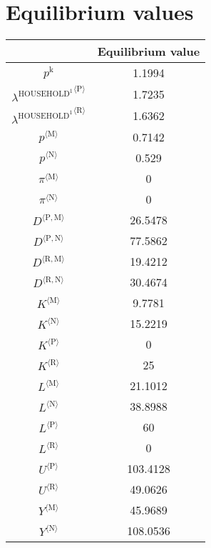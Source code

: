 

\section{Equilibrium values}


\begin{tabular}{c|c|}
  & Equilibrium value\\
\hline
$p^{\mathrm{k}}$ & 1.1994 \\
${\lambda^{\mathrm{HOUSEHOLD}^{\mathrm{1}}}}^{\langle \mathrm{P}\rangle}$ & 1.7235 \\
${\lambda^{\mathrm{HOUSEHOLD}^{\mathrm{1}}}}^{\langle \mathrm{R}\rangle}$ & 1.6362 \\
${p}^{\langle \mathrm{M}\rangle}$ & 0.7142 \\
${p}^{\langle \mathrm{N}\rangle}$ & 0.529 \\
${\pi}^{\langle \mathrm{M}\rangle}$ & 0 \\
${\pi}^{\langle \mathrm{N}\rangle}$ & 0 \\
${D}^{\langle \mathrm{P},\mathrm{M}\rangle}$ & 26.5478 \\
${D}^{\langle \mathrm{P},\mathrm{N}\rangle}$ & 77.5862 \\
${D}^{\langle \mathrm{R},\mathrm{M}\rangle}$ & 19.4212 \\
${D}^{\langle \mathrm{R},\mathrm{N}\rangle}$ & 30.4674 \\
${K}^{\langle \mathrm{M}\rangle}$ & 9.7781 \\
${K}^{\langle \mathrm{N}\rangle}$ & 15.2219 \\
${K}^{\langle \mathrm{P}\rangle}$ & 0 \\
${K}^{\langle \mathrm{R}\rangle}$ & 25 \\
${L}^{\langle \mathrm{M}\rangle}$ & 21.1012 \\
${L}^{\langle \mathrm{N}\rangle}$ & 38.8988 \\
${L}^{\langle \mathrm{P}\rangle}$ & 60 \\
${L}^{\langle \mathrm{R}\rangle}$ & 0 \\
${U}^{\langle \mathrm{P}\rangle}$ & 103.4128 \\
${U}^{\langle \mathrm{R}\rangle}$ & 49.0626 \\
${Y}^{\langle \mathrm{M}\rangle}$ & 45.9689 \\
${Y}^{\langle \mathrm{N}\rangle}$ & 108.0536 \\
\hline
\end{tabular}


